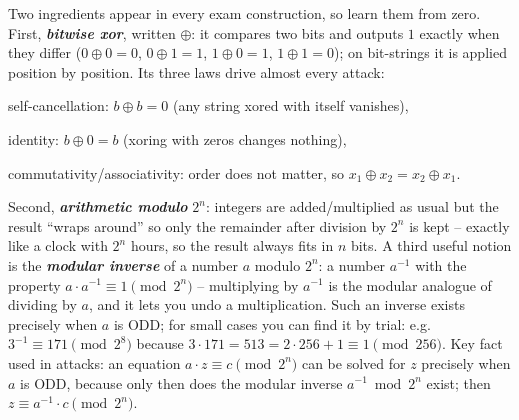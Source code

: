 \documentclass[12pt, a4paper]{article}
\newcommand{\term}[1]{\textbf{\textit{#1}}}        %
\begin{document}
Two ingredients appear in every exam construction, so learn them from zero. First, \term{bitwise xor}, written $\oplus$: it compares two bits and outputs $1$ exactly when they differ ($0 \oplus 0 = 0$, $0 \oplus 1 = 1$, $1 \oplus 0 = 1$, $1 \oplus 1 = 0$); on bit-strings it is applied position by position. Its three laws drive almost every attack:\begin{tightitem}\item self-cancellation: $b \oplus b = 0$ (any string xored with itself vanishes),\item identity: $b \oplus 0 = b$ (xoring with zeros changes nothing),\item commutativity/associativity: order does not matter, so $x_1 \oplus x_2 = x_2 \oplus x_1$.\end{tightitem}Second, \term{arithmetic modulo} $2^{n}$: integers are added/multiplied as usual but the result ``wraps around'' so only the remainder after division by $2^{n}$ is kept -- exactly like a clock with $2^{n}$ hours, so the result always fits in $n$ bits. A third useful notion is the \term{modular inverse} of a number $a$ modulo $2^{n}$: a number $a^{-1}$ with the property $a \cdot a^{-1} \equiv 1 \pmod{2^{n}}$ -- multiplying by $a^{-1}$ is the modular analogue of dividing by $a$, and it lets you undo a multiplication. Such an inverse exists precisely when $a$ is ODD; for small cases you can find it by trial: e.g. $3^{-1} \equiv 171 \pmod{2^{8}}$ because $3 \cdot 171 = 513 = 2 \cdot 256 + 1 \equiv 1 \pmod{256}$. Key fact used in attacks: an equation $a \cdot z \equiv c \pmod{2^{n}}$ can be solved for $z$ precisely when $a$ is ODD, because only then does the modular inverse $a^{-1} \bmod 2^{n}$ exist; then $z \equiv a^{-1} \cdot c \pmod{2^{n}}$.
\end{document}
